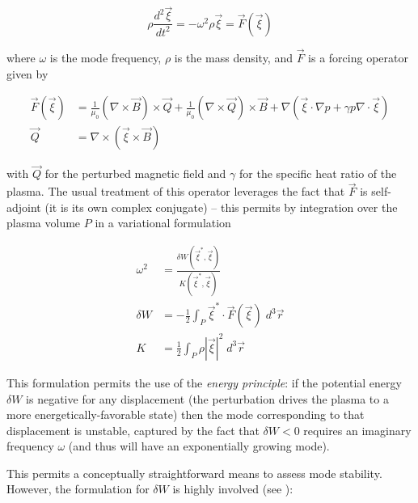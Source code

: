 \begin{equation}\label{eq:mhd_perturb}
 \rho \frac{d^2 \vec{\xi}}{dt^2} = -\omega^2 \rho \vec{\xi} = \vec{F}\left( \vec{\xi} \right)
\end{equation}

\noindent where $\omega$ is the mode frequency, $\rho$ is the mass density, and $\vec{F}$ is a forcing operator given by

\begin{equation}\label{eq:forcing}
 \begin{aligned}
  \vec{F}\left( \vec{\xi} \right) &= \frac{1}{\mu_0} \left( \nabla \times \vec{B} \right) \times \vec{Q} + \frac{1}{\mu_0} \left( \nabla \times \vec{Q} \right) \times \vec{B} + \nabla \left( \vec{\xi} \cdot \nabla p + \gamma p \nabla \cdot \vec{\xi} \right)\\
  \vec{Q} &= \nabla \times \left( \vec{\xi} \times \vec{B} \right)
 \end{aligned}
\end{equation}

\noindent with $\vec{Q}$ for the perturbed magnetic field and $\gamma$ for the specific heat ratio of the plasma.  The usual treatment of this operator leverages the fact that $\vec{F}$ is self-adjoint (\ie it is its own complex conjugate) -- this permits by integration over the plasma volume $P$ in a variational formulation

\begin{equation}\label{eq:energyprinciple}
 \begin{aligned}
  \omega^2 &= \frac{\delta W \left( \vec{\xi}^*,\vec{\xi} \right)}{K\left(\vec{\xi}^*,\vec{\xi} \right)}\\
  \delta W &= -\frac{1}{2} \int_P \vec{\xi}^* \cdot \vec{F} \left( \vec{\xi} \right) \;d^3 \vec{r}\\
  K &= \frac{1}{2} \int_P \rho \left| \vec{\xi} \right|^2 \;d^3 \vec{r}
 \end{aligned}
\end{equation}

\noindent This formulation permits the use of the \emph{energy principle}: if the potential energy $\delta W$ is negative for any displacement (\ie the perturbation drives the plasma to a more energetically-favorable state) then the mode corresponding to that displacement is unstable, captured by the fact that $\delta W < 0$ requires an imaginary frequency $\omega$ (and thus will have an exponentially growing mode).  

This permits a conceptually straightforward means to assess mode stability.  However, the formulation for $\delta W$ is highly involved (see \cite[\S 8.8]{Freidberg1987}):

